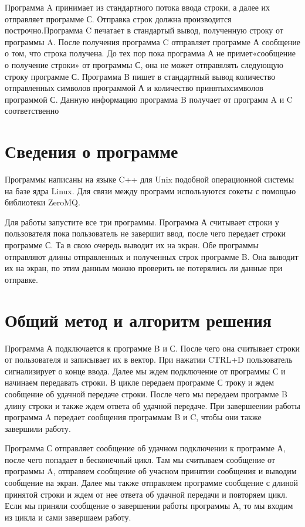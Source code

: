 \documentclass[pdf, unicode, 12pt, a4paper,oneside,fleqn]{article}
\begin{document}
Программа A принимает из стандартного потока ввода строки, а далее их отправляет программе С. Отправка строк должна производится построчно.Программа C печатает в стандартый вывод, полученную строку от программы A. После получения программа C отправляет программе А сообщение о том, что строка получена. До тех пор пока программа А не примет«сообщение о получение строки» от программы С, она не может отправялять следующую строку программе С.
Программа B пишет в стандартный вывод количество отправленных символов программой А и количество принятыхсимволов программой С. Данную информацию программа B получает от программ A и C соответственно

\section{Сведения о программе}

Программы написаны на языке C++ для Unix подобной операционной системы на базе ядра Linux.
Для связи между программ используются сокеты с помощью библиотеки ZeroMQ.

Для работы запустите все три программы. Программа А считывает строки у пользователя пока пользователь не завершит ввод, после чего передает строки программе С. Та в свою очередь выводит их на экран. Обе программы отправляют длины отправленных
и полученных строк программе B. Она выводит их на экран, по этим данным можно проверить не потерялись ли данные при отправке.

\section{Общий метод и алгоритм решения}
Программа А подключается к программе B и С. После чего она считывает строки от пользователя и записывает их в вектор. При нажатии CTRL+D пользователь сигнализирует о конце ввода. 
Далее мы ждем подключение от программы С и начинаем передавать строки. В цикле передаем программе С троку и ждем сообщение об удачной передаче строки.
После чего мы передаем программе B длину строки и также ждем ответа об удачной передаче. При завершеении работы программа A передает сообщения программам B и C,
чтобы они также завершили работу.

Программа С отправляет сообщение об удачном подключении к программе А, после чего попадает в бесконечный цикл.
Там мы считываем сообщение от программы A, отправяем сообщение об учасном принятии сообщения и выводим сообщение на экран. Далее мы также отправляем 
программе сообщение с длиной принятой строки и ждем от нее ответа об удачной передачи и повторяем цикл. Если мы приняли сообщение о завершении работы программы А, то мы входим из цикла и сами завершаем работу.
\end{document}
